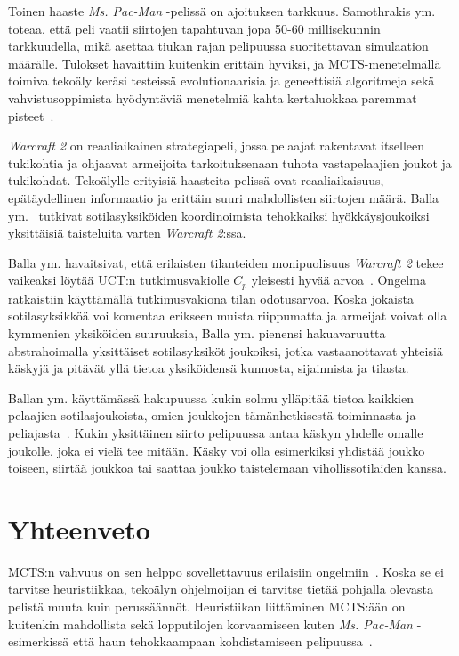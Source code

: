 \documentclass[12pt,finnish]{tktltiki2}
\theoremstyle{definition}
\theoremstyle{remark}
\begin{document}
Toinen haaste \textit{Ms. Pac-Man} -pelissä on ajoituksen tarkkuus. Samothrakis ym. toteaa, että peli vaatii siirtojen tapahtuvan jopa 50-60 millisekunnin tarkkuudella, mikä asettaa tiukan rajan pelipuussa suoritettavan simulaation määrälle. Tulokset havaittiin kuitenkin erittäin hyviksi, ja MCTS-menetelmällä toimiva tekoäly keräsi testeissä evolutionaarisia ja geneettisiä algoritmeja sekä vahvistusoppimista hyödyntäviä menetelmiä kahta kertaluokkaa paremmat pisteet~\cite{samothrakis}.

\textit{Warcraft 2} on reaaliaikainen strategiapeli, jossa pelaajat rakentavat itselleen tukikohtia ja ohjaavat armeijoita tarkoituksenaan tuhota vastapelaajien joukot ja tukikohdat. Tekoälylle erityisiä haasteita pelissä ovat reaaliaikaisuus, epätäydellinen informaatio ja erittäin suuri mahdollisten siirtojen määrä. Balla ym.~\cite{balla} tutkivat sotilasyksiköiden koordinoimista tehokkaiksi hyökkäysjoukoiksi yksittäisiä taisteluita varten \textit{Warcraft 2}:ssa.

Balla ym. havaitsivat, että erilaisten tilanteiden monipuolisuus \textit{Warcraft 2} tekee vaikeaksi löytää UCT:n tutkimusvakiolle $C_p$ yleisesti hyvää arvoa~\cite{balla}. Ongelma ratkaistiin käyttämällä tutkimusvakiona tilan odotusarvoa. Koska jokaista sotilasyksikköä voi komentaa erikseen muista riippumatta ja armeijat voivat olla kymmenien yksiköiden suuruuksia, Balla ym. pienensi hakuavaruutta abstrahoimalla yksittäiset sotilasyksiköt joukoiksi, jotka vastaanottavat yhteisiä käskyjä ja pitävät yllä tietoa yksiköidensä kunnosta, sijainnista ja tilasta.

Ballan ym. käyttämässä hakupuussa kukin solmu ylläpitää tietoa kaikkien pelaajien sotilasjoukoista, omien joukkojen tämänhetkisestä toiminnasta ja peliajasta~\cite{balla}. Kukin yksittäinen siirto pelipuussa antaa käskyn yhdelle omalle joukolle, joka ei vielä tee mitään. Käsky voi olla esimerkiksi yhdistää joukko toiseen, siirtää joukkoa tai saattaa joukko taistelemaan vihollissotilaiden kanssa.

\section{Yhteenveto}

MCTS:n vahvuus on sen helppo sovellettavuus erilaisiin ongelmiin~\cite{browne}. Koska se ei tarvitse heuristiikkaa, tekoälyn ohjelmoijan ei tarvitse tietää pohjalla olevasta pelistä muuta kuin perussäännöt. Heuristiikan liittäminen MCTS:ään on kuitenkin mahdollista sekä lopputilojen korvaamiseen kuten \textit{Ms. Pac-Man} -esimerkissä että haun tehokkaampaan kohdistamiseen pelipuussa~\cite{browne}.
\end{document}
